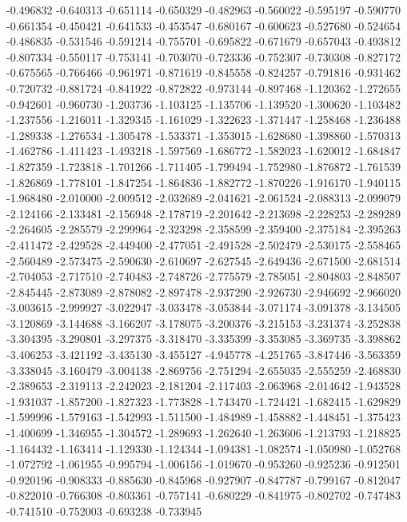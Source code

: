 -0.496832
-0.640313
-0.651114
-0.650329
-0.482963
-0.560022
-0.595197
-0.590770
-0.661354
-0.450421
-0.641533
-0.453547
-0.680167
-0.600623
-0.527680
-0.524654
-0.486835
-0.531546
-0.591214
-0.755701
-0.695822
-0.671679
-0.657043
-0.493812
-0.807334
-0.550117
-0.753141
-0.703070
-0.723336
-0.752307
-0.730308
-0.827172
-0.675565
-0.766466
-0.961971
-0.871619
-0.845558
-0.824257
-0.791816
-0.931462
-0.720732
-0.881724
-0.841922
-0.872822
-0.973144
-0.897468
-1.120362
-1.272655
-0.942601
-0.960730
-1.203736
-1.103125
-1.135706
-1.139520
-1.300620
-1.103482
-1.237556
-1.216011
-1.329345
-1.161029
-1.322623
-1.371447
-1.258468
-1.236488
-1.289338
-1.276534
-1.305478
-1.533371
-1.353015
-1.628680
-1.398860
-1.570313
-1.462786
-1.411423
-1.493218
-1.597569
-1.686772
-1.582023
-1.620012
-1.684847
-1.827359
-1.723818
-1.701266
-1.711405
-1.799494
-1.752980
-1.876872
-1.761539
-1.826869
-1.778101
-1.847254
-1.864836
-1.882772
-1.870226
-1.916170
-1.940115
-1.968480
-2.010000
-2.009512
-2.032689
-2.041621
-2.061524
-2.088313
-2.099079
-2.124166
-2.133481
-2.156948
-2.178719
-2.201642
-2.213698
-2.228253
-2.289289
-2.264605
-2.285579
-2.299964
-2.323298
-2.358599
-2.359400
-2.375184
-2.395263
-2.411472
-2.429528
-2.449400
-2.477051
-2.491528
-2.502479
-2.530175
-2.558465
-2.560489
-2.573475
-2.590630
-2.610697
-2.627545
-2.649436
-2.671500
-2.681514
-2.704053
-2.717510
-2.740483
-2.748726
-2.775579
-2.785051
-2.804803
-2.848507
-2.845445
-2.873089
-2.878082
-2.897478
-2.937290
-2.926730
-2.946692
-2.966020
-3.003615
-2.999927
-3.022947
-3.033478
-3.053844
-3.071174
-3.091378
-3.134505
-3.120869
-3.144688
-3.166207
-3.178075
-3.200376
-3.215153
-3.231374
-3.252838
-3.304395
-3.290801
-3.297375
-3.318470
-3.335399
-3.353085
-3.369735
-3.398862
-3.406253
-3.421192
-3.435130
-3.455127
-4.945778
-4.251765
-3.847446
-3.563359
-3.338045
-3.160479
-3.004138
-2.869756
-2.751294
-2.655035
-2.555259
-2.468830
-2.389653
-2.319113
-2.242023
-2.181204
-2.117403
-2.063968
-2.014642
-1.943528
-1.931037
-1.857200
-1.827323
-1.773828
-1.743470
-1.724421
-1.682415
-1.629829
-1.599996
-1.579163
-1.542993
-1.511500
-1.484989
-1.458882
-1.448451
-1.375423
-1.400699
-1.346955
-1.304572
-1.289693
-1.262640
-1.263606
-1.213793
-1.218825
-1.164432
-1.163414
-1.129330
-1.124344
-1.094381
-1.082574
-1.050980
-1.052768
-1.072792
-1.061955
-0.995794
-1.006156
-1.019670
-0.953260
-0.925236
-0.912501
-0.920196
-0.908333
-0.885630
-0.845968
-0.927907
-0.847787
-0.799167
-0.812047
-0.822010
-0.766308
-0.803361
-0.757141
-0.680229
-0.841975
-0.802702
-0.747483
-0.741510
-0.752003
-0.693238
-0.733945
